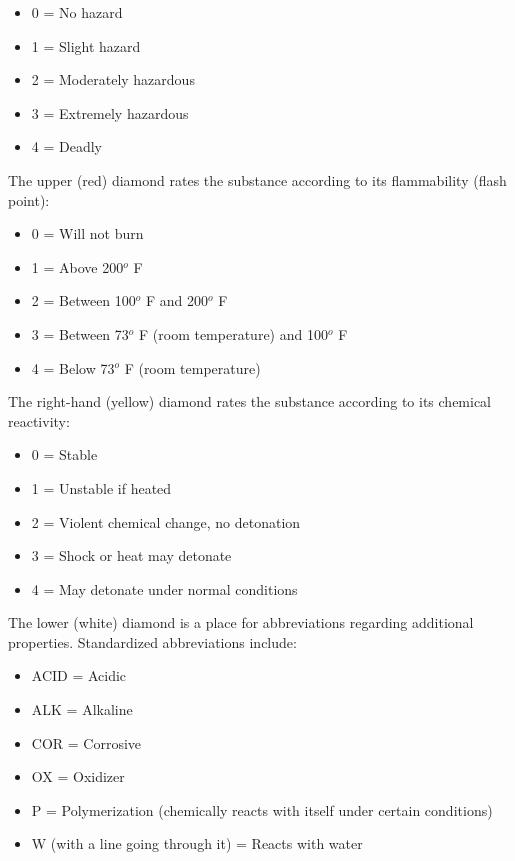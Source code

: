\begin{itemize}
\item{} 0 = No hazard
\item{} 1 = Slight hazard
\item{} 2 = Moderately hazardous
\item{} 3 = Extremely hazardous
\item{} 4 = Deadly
\end{itemize} 

\vskip 10pt

The upper (red) diamond rates the substance according to its flammability (flash point):

\begin{itemize}
\item{} 0 = Will not burn
\item{} 1 = Above 200$^{o}$ F
\item{} 2 = Between 100$^{o}$ F and 200$^{o}$ F
\item{} 3 = Between 73$^{o}$ F (room temperature) and 100$^{o}$ F
\item{} 4 = Below 73$^{o}$ F (room temperature)
\end{itemize} 

\vskip 10pt

The right-hand (yellow) diamond rates the substance according to its chemical reactivity:

\begin{itemize}
\item{} 0 = Stable
\item{} 1 = Unstable if heated
\item{} 2 = Violent chemical change, no detonation
\item{} 3 = Shock or heat may detonate
\item{} 4 = May detonate under normal conditions
\end{itemize} 

\vskip 10pt

The lower (white) diamond is a place for abbreviations regarding additional properties.  Standardized abbreviations include:

\begin{itemize}
\item{} ACID = Acidic
\item{} ALK = Alkaline
\item{} COR = Corrosive
\item{} OX = Oxidizer
\item{} P = Polymerization (chemically reacts with itself under certain conditions)
\item{} W (with a line going through it) = Reacts with water
\end{itemize} 




